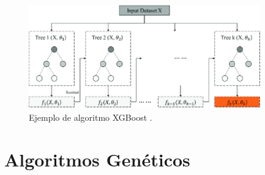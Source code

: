 \documentclass{uathesis-es}
\begin{document}
\begin{figure}[H]
    \centering
    \includegraphics[width=10cm]{Figures/Background/XGBoost-model-process.png}
    \caption{Ejemplo de algoritmo XGBoost \cite{XGBOOST_IMAGE}.}
    \label{XGBOOST_BACKGROUND}
\end{figure}









\section{Algoritmos Genéticos}

\end{document}
